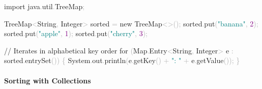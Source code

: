 \documentclass[
  justified,
  openright,
]{tufte-book}
\let\subsubsection\paragraph
\let\paragraph\paragraph
\newcommand{\BuiltInTok}[1]{#1}
\newcommand{\CommentTok}[1]{\textcolor{MidGray}{#1}}
\newcommand{\ControlFlowTok}[1]{\textcolor{BrandBlue}{#1}}
\newcommand{\DecValTok}[1]{\textcolor{Purple}{#1}}
\newcommand{\FunctionTok}[1]{\textcolor{BrandBlue}{#1}}
\newcommand{\ImportTok}[1]{\textcolor{BrandAccent}{#1}}
\newcommand{\KeywordTok}[1]{\textcolor{BrandBlue}{#1}}
\newcommand{\NormalTok}[1]{#1}
\newcommand{\OperatorTok}[1]{\textcolor{DarkGray}{#1}}
\newcommand{\StringTok}[1]{\textcolor{Teal}{#1}}
\newenvironment{Shaded}{%
  \begin{snugshade}
}{%
  \end{snugshade}
}
\let\subsubsection\paragraph
\let\paragraph\paragraph
\begin{document}
\begin{Shaded}
\begin{Highlighting}[]
\KeywordTok{import} \ImportTok{java}\OperatorTok{.}\ImportTok{util}\OperatorTok{.}\ImportTok{TreeMap}\OperatorTok{;}

\BuiltInTok{TreeMap}\OperatorTok{\textless{}}\BuiltInTok{String}\OperatorTok{,} \BuiltInTok{Integer}\OperatorTok{\textgreater{}}\NormalTok{ sorted }\OperatorTok{=} \KeywordTok{new} \BuiltInTok{TreeMap}\OperatorTok{\textless{}\textgreater{}();}
\NormalTok{sorted}\OperatorTok{.}\FunctionTok{put}\OperatorTok{(}\StringTok{"banana"}\OperatorTok{,} \DecValTok{2}\OperatorTok{);}
\NormalTok{sorted}\OperatorTok{.}\FunctionTok{put}\OperatorTok{(}\StringTok{"apple"}\OperatorTok{,} \DecValTok{1}\OperatorTok{);}
\NormalTok{sorted}\OperatorTok{.}\FunctionTok{put}\OperatorTok{(}\StringTok{"cherry"}\OperatorTok{,} \DecValTok{3}\OperatorTok{);}

\CommentTok{// Iterates in alphabetical key order}
\ControlFlowTok{for} \OperatorTok{(}\BuiltInTok{Map}\OperatorTok{.}\FunctionTok{Entry}\OperatorTok{\textless{}}\BuiltInTok{String}\OperatorTok{,} \BuiltInTok{Integer}\OperatorTok{\textgreater{}}\NormalTok{ e }\OperatorTok{:}\NormalTok{ sorted}\OperatorTok{.}\FunctionTok{entrySet}\OperatorTok{())} \OperatorTok{\{}
    \BuiltInTok{System}\OperatorTok{.}\FunctionTok{out}\OperatorTok{.}\FunctionTok{println}\OperatorTok{(}\NormalTok{e}\OperatorTok{.}\FunctionTok{getKey}\OperatorTok{()} \OperatorTok{+} \StringTok{": "} \OperatorTok{+}\NormalTok{ e}\OperatorTok{.}\FunctionTok{getValue}\OperatorTok{());}
\OperatorTok{\}}
\end{Highlighting}
\end{Shaded}

\subsubsection{Sorting with Collections}\label{sorting-with-collections}
\end{document}
